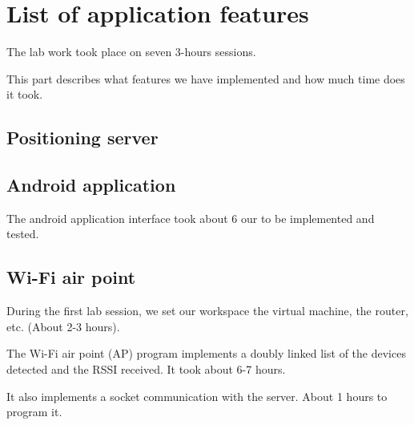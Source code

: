 \section{List of application features}

The lab work took place on seven 3-hours sessions.

This part describes what features we have implemented and how much time does it
took.

\subsection{Positioning server}

\subsection{Android application}

The android application interface took about 6 our to be implemented and tested.

\subsection{Wi-Fi air point}

During the first lab session, we set our workspace the virtual machine, 
the router, etc. (About 2-3 hours).

The Wi-Fi air point (AP) program implements a doubly linked list of the devices
detected and the RSSI received. It took about 6-7 hours.

It also implements a socket communication with the server. About 1 hours to
program it.





